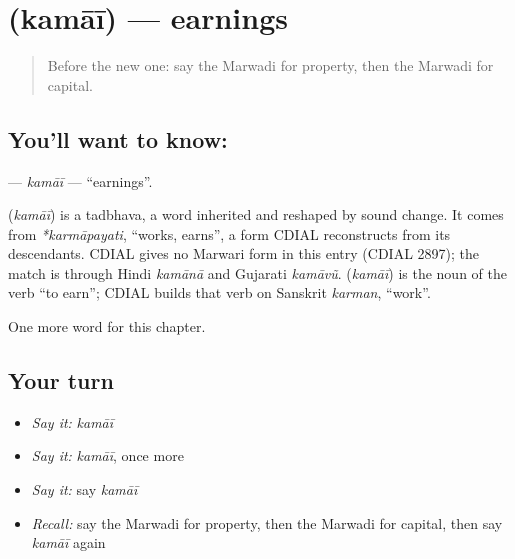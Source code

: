 \section[\texorpdfstring{\mw{कमाई} (kamāī)}{कमाई (kamāī)}]{ (kamāī) — earnings}

\label{lesson:MW-C115-kamai}



\begin{quote}
Before the new one: say the Marwadi for property, then the Marwadi for capital.
\end{quote}

\subsection*{You'll want to know: }
\textbf{} — \emph{kamāī} — \textquotedblleft{}earnings\textquotedblright{}.

\begin{cousinweb}
\textbf{} (\emph{kamāī}) is a tadbhava, a word inherited and reshaped by sound change. It comes from \emph{*karmāpayati}, \textquotedblleft{}works, earns\textquotedblright{}, a form CDIAL reconstructs from its descendants. CDIAL gives no Marwari form in this entry (CDIAL 2897); the match is through Hindi \emph{kamānā} and Gujarati \emph{kamāvũ}. \textbf{} (\emph{kamāī}) is the noun of the verb \textquotedblleft{}to earn\textquotedblright{}; CDIAL builds that verb on Sanskrit \emph{karman}, \textquotedblleft{}work\textquotedblright{}.
\end{cousinweb}

\begin{grammarlens}[title={What you've built}]
One more word for this chapter.
\end{grammarlens}

\subsection*{Your turn}
\begin{itemize}
\raggedright
  \item \emph{Say it:} \emph{kamāī}
  \item \emph{Say it:} \emph{kamāī}, once more
  \item \emph{Say it:} say \emph{kamāī}
  \item \emph{Recall:} say the Marwadi for property, then the Marwadi for capital, then say \emph{kamāī} again
\end{itemize}

